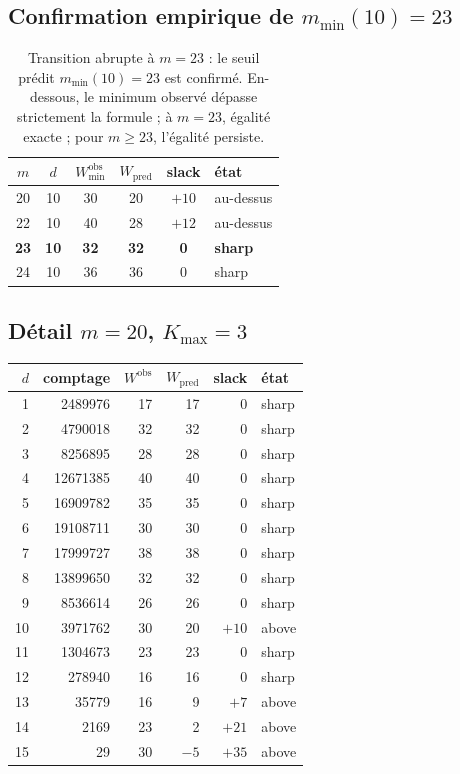 \documentclass[11pt,a4paper]{article}
\begin{document}
\subsection{Confirmation empirique de $m_{\min}(10)=23$}

\begin{table}[h]
\centering
\begin{tabular}{cccccl}
\toprule
$m$ & $d$ & $W^{\text{obs}}_{\min}$ & $W_{\mathrm{pred}}$ & slack & état \\
\midrule
20 & 10 & 30 & 20 & $+10$ & au-dessus \\
22 & 10 & 40 & 28 & $+12$ & au-dessus \\
\textbf{23} & \textbf{10} & \textbf{32} & \textbf{32} & \textbf{0} & \textbf{sharp} \\
24 & 10 & 36 & 36 & $0$  & sharp \\
\bottomrule
\end{tabular}
\caption{Transition abrupte à $m=23$ : le seuil prédit $m_{\min}(10)=23$
est confirmé. En-dessous, le minimum observé dépasse strictement la formule ;
à $m=23$, égalité exacte ; pour $m\ge 23$, l'égalité persiste.}
\end{table}

\subsection{Détail $m=20$, $K_{\max}=3$}

\begin{center}\small
\begin{tabular}{rrrrrl}
\toprule
$d$ & comptage & $W^{\text{obs}}$ & $W_{\mathrm{pred}}$ & slack & état \\
\midrule
 1 & \num{2489976}  & 17 & 17 & 0 & sharp \\
 2 & \num{4790018}  & 32 & 32 & 0 & sharp \\
 3 & \num{8256895}  & 28 & 28 & 0 & sharp \\
 4 & \num{12671385} & 40 & 40 & 0 & sharp \\
 5 & \num{16909782} & 35 & 35 & 0 & sharp \\
 6 & \num{19108711} & 30 & 30 & 0 & sharp \\
 7 & \num{17999727} & 38 & 38 & 0 & sharp \\
 8 & \num{13899650} & 32 & 32 & 0 & sharp \\
 9 & \num{8536614}  & 26 & 26 & 0 & sharp \\
10 & \num{3971762}  & 30 & 20 & $+10$ & above \\
11 & \num{1304673}  & 23 & 23 & 0 & sharp \\
12 & \num{278940}   & 16 & 16 & 0 & sharp \\
13 & \num{35779}    & 16 &  9 & $+7$  & above \\
14 & \num{2169}     & 23 &  2 & $+21$ & above \\
15 & \num{29}       & 30 & $-5$ & $+35$ & above \\
\bottomrule
\end{tabular}
\end{center}
\end{document}
